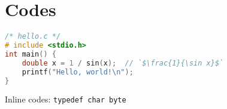 \section{Codes}
\begin{lstlisting}[language=C]
/* hello.c */
# include <stdio.h>
int main() {
    double x = 1 / sin(x);  // `$\frac{1}{\sin x}$`
    printf("Hello, world!\n");
}
\end{lstlisting}

Inline codes: \lstinline!typedef char byte!